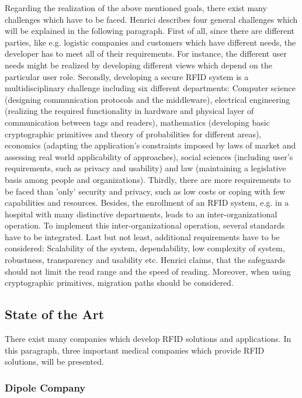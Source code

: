 Regarding the realization of the above mentioned goals, there exist many challenges which have to be faced. Henrici \cite[p.66 ff.]{henrici} describes four general challenges which will be explained in the following paragraph. 
First of all, since there are different parties, like e.g. logistic companies and customers which have different needs, the developer has to meet all of their requirements. For instance, the different user needs might be realized by developing different views which depend on the particular user role.
Secondly, developing a secure RFID system is a multidisciplinary challenge \cite{henrici} including six different departments: Computer science (designing communication protocols and the middleware), electrical engineering (realizing the required functionality in hardware and physical layer of communication between tags and readers), mathematics (developing basic cryptographic primitives and theory of probabilities for different areas), economics (adapting the application's constraints imposed by laws of market and assessing real world applicability of approaches), social sciences (including user's requirements, such as privacy and usability) and law (maintaining a legislative basis among people and organizations).
Thirdly, there are more requirements to be faced than 'only' security and privacy, such as low costs or coping with few capabilities and resources. Besides, the enrollment of an RFID system, e.g. in a hospital with many distinctive departments, leads to an inter-organizational operation. To implement this inter-organizational operation, several standards have to be integrated. 
Last but not least, additional requirements have to be considered: Scalability of the system, dependability, low complexity of system, robustness, transparency and usability etc. Henrici claims, that the safeguards should not limit the read range and the speed of reading. Moreover, when using cryptographic primitives, migration paths should be considered.  

\subsection{State of the Art}

There exist many companies which develop \ac{RFID} solutions and applications. In this paragraph, three important medical companies which provide RFID solutions, will be presented.

\subsubsection{Dipole Company}

